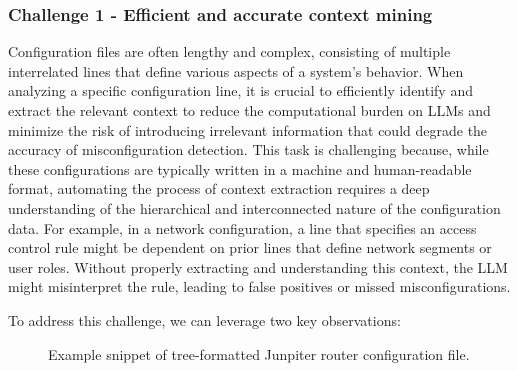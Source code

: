 \subsubsection{Challenge 1 - Efficient and accurate context mining}
\label{challenge_1}
Configuration files are often lengthy and complex, consisting of multiple interrelated lines that define various aspects of a system's behavior. When analyzing a specific configuration line, it is crucial to efficiently identify and extract the relevant context to reduce the computational burden on LLMs and minimize the risk of introducing irrelevant information that could degrade the accuracy of misconfiguration detection. This task is challenging because, while these configurations are typically written in a machine and human-readable format, automating the process of context extraction requires a deep understanding of the hierarchical and interconnected nature of the configuration data. For example, in a network configuration, a line that specifies an access control rule might be dependent on prior lines that define network segments or user roles. Without properly extracting and understanding this context, the LLM might misinterpret the rule, leading to false positives or missed misconfigurations.

 To address this challenge, we can leverage two key observations:
\begin{figure}[t]
    \centering
    \caption{Example snippet of tree-formatted Junpiter router configuration file.}
    \label{fig:tree}
\end{figure}

